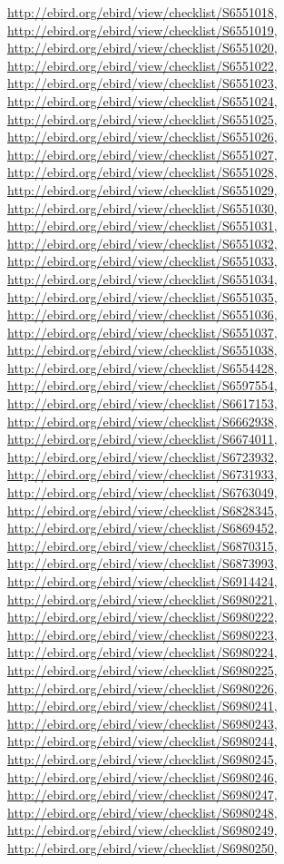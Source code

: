 \documentclass[9pt, article]{memoir}
\begin{document}
\begin{multicols}{2}
\url{http://ebird.org/ebird/view/checklist/S6551018}, 
\url{http://ebird.org/ebird/view/checklist/S6551019}, 
\url{http://ebird.org/ebird/view/checklist/S6551020}, 
\url{http://ebird.org/ebird/view/checklist/S6551022}, 
\url{http://ebird.org/ebird/view/checklist/S6551023}, 
\url{http://ebird.org/ebird/view/checklist/S6551024}, 
\url{http://ebird.org/ebird/view/checklist/S6551025}, 
\url{http://ebird.org/ebird/view/checklist/S6551026}, 
\url{http://ebird.org/ebird/view/checklist/S6551027}, 
\url{http://ebird.org/ebird/view/checklist/S6551028}, 
\url{http://ebird.org/ebird/view/checklist/S6551029}, 
\url{http://ebird.org/ebird/view/checklist/S6551030}, 
\url{http://ebird.org/ebird/view/checklist/S6551031}, 
\url{http://ebird.org/ebird/view/checklist/S6551032}, 
\url{http://ebird.org/ebird/view/checklist/S6551033}, 
\url{http://ebird.org/ebird/view/checklist/S6551034}, 
\url{http://ebird.org/ebird/view/checklist/S6551035}, 
\url{http://ebird.org/ebird/view/checklist/S6551036}, 
\url{http://ebird.org/ebird/view/checklist/S6551037}, 
\url{http://ebird.org/ebird/view/checklist/S6551038}, 
\url{http://ebird.org/ebird/view/checklist/S6554428}, 
\url{http://ebird.org/ebird/view/checklist/S6597554}, 
\url{http://ebird.org/ebird/view/checklist/S6617153}, 
\url{http://ebird.org/ebird/view/checklist/S6662938}, 
\url{http://ebird.org/ebird/view/checklist/S6674011}, 
\url{http://ebird.org/ebird/view/checklist/S6723932}, 
\url{http://ebird.org/ebird/view/checklist/S6731933}, 
\url{http://ebird.org/ebird/view/checklist/S6763049}, 
\url{http://ebird.org/ebird/view/checklist/S6828345}, 
\url{http://ebird.org/ebird/view/checklist/S6869452}, 
\url{http://ebird.org/ebird/view/checklist/S6870315}, 
\url{http://ebird.org/ebird/view/checklist/S6873993}, 
\url{http://ebird.org/ebird/view/checklist/S6914424}, 
\url{http://ebird.org/ebird/view/checklist/S6980221}, 
\url{http://ebird.org/ebird/view/checklist/S6980222}, 
\url{http://ebird.org/ebird/view/checklist/S6980223}, 
\url{http://ebird.org/ebird/view/checklist/S6980224}, 
\url{http://ebird.org/ebird/view/checklist/S6980225}, 
\url{http://ebird.org/ebird/view/checklist/S6980226}, 
\url{http://ebird.org/ebird/view/checklist/S6980241}, 
\url{http://ebird.org/ebird/view/checklist/S6980243}, 
\url{http://ebird.org/ebird/view/checklist/S6980244}, 
\url{http://ebird.org/ebird/view/checklist/S6980245}, 
\url{http://ebird.org/ebird/view/checklist/S6980246}, 
\url{http://ebird.org/ebird/view/checklist/S6980247}, 
\url{http://ebird.org/ebird/view/checklist/S6980248}, 
\url{http://ebird.org/ebird/view/checklist/S6980249}, 
\url{http://ebird.org/ebird/view/checklist/S6980250}, 

\end{multicols}
\end{document}
